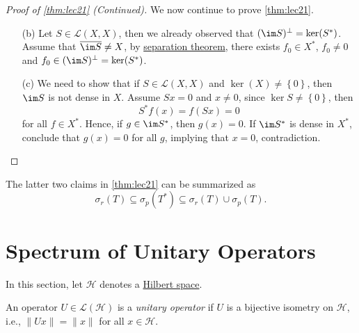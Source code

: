 \begin{proof}[Proof of \autoref{thm:lec21} (Continued)]
	We now continue to prove \autoref{thm:lec21}.
	\begin{enumerate}
		\item[(b)] Let \(S\in \mathcal{L} (X, X)\), then we already observed that \((\im S)^{\perp} = \ker(S^{\ast} )\). Assume that \(\overline{\im S} \neq X\), by \hyperref[thm:separation-of-convex-sets]{separation theorem}, there exists \(f_0\in X^{\ast} \), \(f_0 \neq 0\) and \(f_0 \in (\im S)^{\perp} = \ker(S^{\ast} )\).
		\item[(c)] We need to show that if \(S\in \mathcal{L} (X, X)\) and \(\ker(X) \neq \left\{ 0 \right\} \), then \(\im S\) is not dense in \(X\). Assume \(Sx = 0\) and \(x \neq 0\), since \(\ker S \neq \left\{ 0 \right\} \), then
			\[
				S^{\ast} f(x) = f(Sx) = 0
			\]
			for all \(f\in X^{\ast} \). Hence, if \(g\in \im S^{\ast} \), then \(g(x) = 0\). If \(\im S^{\ast} \) is dense in \(X^{\ast} \), conclude that \(g(x) = 0\) for all \(g\), implying that \(x = 0\), contradiction.
	\end{enumerate}
\end{proof}

\begin{remark}
	The latter two claims in \autoref{thm:lec21} can be summarized as
	\[
		\sigma _r(T) \subseteq \sigma _p(T^{\ast} ) \subseteq \sigma _r(T) \cup \sigma _p(T).
	\]
\end{remark}

\section{Spectrum of Unitary Operators}
In this section, let \(\mathcal{H} \) denotes a \hyperref[def:Hilbert-space]{Hilbert space}.

\begin{prev}
	An operator \(U\in \mathcal{L} (\mathcal{H} )\) is a \emph{unitary operator} if \(U\) is a bijective isometry on \(\mathcal{H} \), i.e., \(\lVert Ux \rVert = \lVert x \rVert \) for all \(x\in \mathcal{H} \).
\end{prev}


